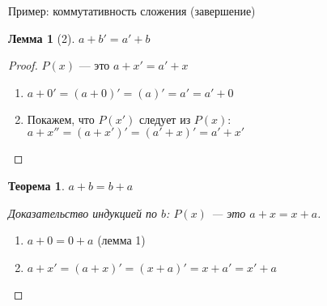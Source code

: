 \documentclass[aspectratio=169]{beamer}
\newtheorem{thm}{Теорема}[section]
\newtheorem{lmm}{Лемма}[section]
\begin{document}
\begin{frame}{Пример: коммутативность сложения (завершение)}
\begin{lmm}[2]
$a + b' = a' + b$
\end{lmm}\pause
\begin{proof} $P(x)$ --- это $a + x' = a' + x$\pause
\begin{enumerate}
\item $a + 0' = (a + 0)' = (a)' = a' = a' + 0$\pause
\item Покажем, что $P(x')$ следует из $P(x)$: $a + x'' = (a + x')' = (a' + x)' = a' + x'$
\end{enumerate}
\end{proof}\pause

\begin{thm}
$a + b = b + a$
\end{thm}\pause
\begin{proof}[Доказательство индукцией по $b$: $P(x)$ --- это $a + x = x + a$]
\begin{enumerate}
\item $a + 0 = 0 + a$ (лемма 1)\pause
\item $a + x' = (a + x)' = (x + a)' = x + a' = x' + a$
\end{enumerate}
\end{proof}
\end{frame}
\end{document}
